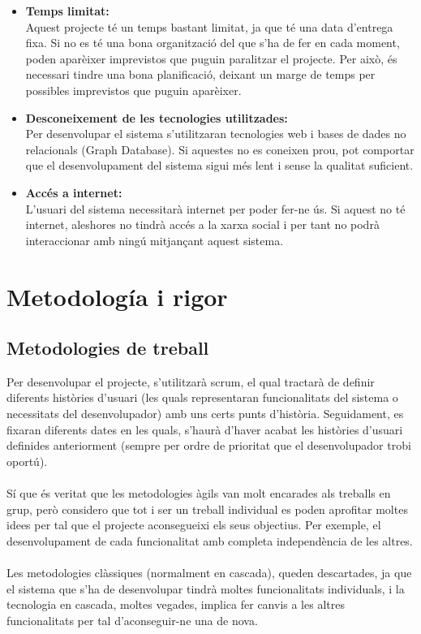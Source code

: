 \documentclass[11pt,catalan,listoffigures,listoftables]{tfgetsinf}
\begin{document}
\begin{itemize}
	\item \textbf{Temps limitat:} \\Aquest projecte té un temps bastant limitat, ja que té una data d’entrega fixa. Si no es té una bona organització del que s’ha de fer en cada moment, poden aparèixer imprevistos que puguin paralitzar el projecte. Per això, és necessari tindre una bona planificació, deixant un marge de temps per possibles imprevistos que puguin aparèixer.
	\item \textbf{Desconeixement de les tecnologies utilitzades:} \\Per desenvolupar el sistema s’utilitzaran tecnologies web i bases de dades no relacionals (Graph Database). Si aquestes no es coneixen prou, pot comportar que el desenvolupament del sistema sigui més lent i sense la qualitat suficient.
	\item \textbf{Accés a internet:} \\L’usuari del sistema necessitarà internet per poder fer-ne ús. Si aquest no té internet, aleshores no tindrà accés a la xarxa social i per tant no podrà interaccionar amb ningú mitjançant aquest sistema.
\end{itemize} 

\section{Metodología i rigor}

\subsection{Metodologies de treball} 

Per desenvolupar el projecte, s’utilitzarà scrum, el qual tractarà de definir diferents històries d’usuari (les quals representaran funcionalitats del sistema o necessitats del desenvolupador) amb uns certs punts d’història. Seguidament, es fixaran diferents dates en les quals, s’haurà d’haver acabat les històries d’usuari definides anteriorment (sempre per ordre de prioritat que el desenvolupador trobi oportú).\\ \\
Sí que és veritat que les metodologies àgils van molt encarades als treballs en grup, però considero que tot i ser un treball individual es poden aprofitar moltes idees per tal que el projecte aconsegueixi els seus objectius. Per exemple, el desenvolupament de cada funcionalitat amb completa independència de les altres.\\ \\
Les metodologies clàssiques (normalment en cascada), queden descartades, ja que el sistema que s’ha de desenvolupar tindrà moltes funcionalitats individuals, i la tecnologia en cascada, moltes vegades, implica fer canvis a les altres funcionalitats per tal d’aconseguir-ne una de nova.
\end{document}
